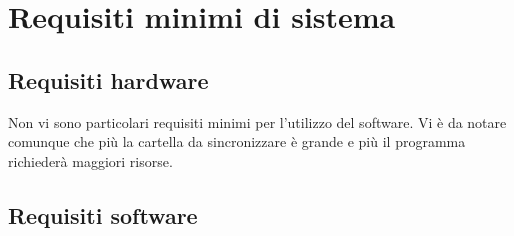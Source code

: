 \section{Requisiti minimi di sistema}

\subsection{Requisiti hardware}

Non vi sono particolari requisiti minimi per l'utilizzo del software. Vi è da notare comunque che più la cartella da sincronizzare è grande e più il programma richiederà maggiori risorse.

\subsection{Requisiti software}

